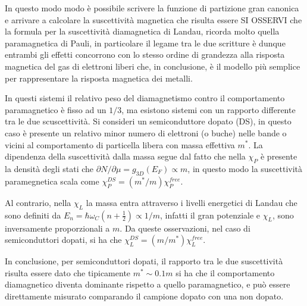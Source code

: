 In questo modo modo \`e possibile scrivere la funzione di partizione gran canonica e arrivare a calcolare la suscettivit\`a magnetica che risulta essere
SI OSSERVI che la formula per la suscettivit\`a diamagnetica di Landau, ricorda molto quella paramagnetica di Pauli, in particolare il legame tra le due scritture \`e 
dunque entrambi gli effetti concorrono con lo stesso ordine di grandezza alla risposta magnetica del gas di elettroni liberi che, in conclusione, \`e il modello pi\`u semplice per rappresentare la risposta magnetica dei metalli.

In questi sistemi il relativo peso del diamagnetismo contro il comportamento paramagnetico \`e fisso ad un $1/3$, ma esistono sistemi con un rapporto differente tra le due scuscettivit\`a. Si consideri un semiconduttore dopato (DS), in questo caso \`e presente un relativo minor numero di elettroni (o buche) nelle bande o vicini al comportamento di particella libera con massa effettiva $m^*$. La dipendenza della suscettivit\`a dalla massa segue dal fatto che nella $\chi_P$ \`e presente la densit\`a degli stati che $\partial N/\partial\mu=g_{3D}(E_F)\propto m$, in questo modo la suscettivit\`a paramegnetica scala come $\chi_P^{DS} = (m^*/m)\chi_P^{free}$.

Al contrario, nella $\chi_L$ la massa entra attraverso i livelli energetici di Landau che sono definiti da $E_n = \hbar\omega_C\left(n+\frac{1}{2}\right) \propto 1/m$, infatti il gran potenziale e $\chi_L$, sono inversamente proporzionali a $m$. Da queste osservazioni, nel caso di semiconduttori dopati, si ha che $\chi_L^{DS} = (m/m^*) \chi_L^{free}$.

In conclusione, per semiconduttori dopati, il rapporto tra le due suscettivit\`a risulta essere
dato che tipicamente $m^* \sim 0.1m$ si ha che il comportamento diamagnetico diventa dominante rispetto a quello paramagnetico, e pu\`o essere direttamente misurato comparando il campione dopato con una non dopato.
